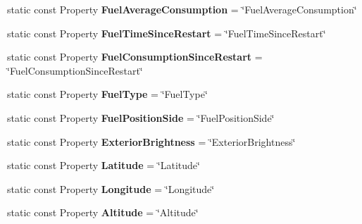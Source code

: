 \begin{DoxyCompactItemize}
\item 
\hypertarget{classVehicleProperty_add43436a1abdac3e56d4bac9ad0f919f}{static const Property {\bfseries Fuel\+Average\+Consumption} = \char`\"{}Fuel\+Average\+Consumption\char`\"{}}\label{classVehicleProperty_add43436a1abdac3e56d4bac9ad0f919f}

\item 
\hypertarget{classVehicleProperty_ac0a8562820cc38f78d806cba49372ed9}{static const Property {\bfseries Fuel\+Time\+Since\+Restart} = \char`\"{}Fuel\+Time\+Since\+Restart\char`\"{}}\label{classVehicleProperty_ac0a8562820cc38f78d806cba49372ed9}

\item 
\hypertarget{classVehicleProperty_a7d6a9cf70c023922f792c3ce7c0b0db0}{static const Property {\bfseries Fuel\+Consumption\+Since\+Restart} = \char`\"{}Fuel\+Consumption\+Since\+Restart\char`\"{}}\label{classVehicleProperty_a7d6a9cf70c023922f792c3ce7c0b0db0}

\item 
\hypertarget{classVehicleProperty_a2df3b5ff14ec4a92fba65ad72be7d5b7}{static const Property {\bfseries Fuel\+Type} = \char`\"{}Fuel\+Type\char`\"{}}\label{classVehicleProperty_a2df3b5ff14ec4a92fba65ad72be7d5b7}

\item 
\hypertarget{classVehicleProperty_a574a971800258aa3d53126ec01e85477}{static const Property {\bfseries Fuel\+Position\+Side} = \char`\"{}Fuel\+Position\+Side\char`\"{}}\label{classVehicleProperty_a574a971800258aa3d53126ec01e85477}

\item 
\hypertarget{classVehicleProperty_a490658c5e633ab54a5bbf11b5f38e994}{static const Property {\bfseries Exterior\+Brightness} = \char`\"{}Exterior\+Brightness\char`\"{}}\label{classVehicleProperty_a490658c5e633ab54a5bbf11b5f38e994}

\item 
\hypertarget{classVehicleProperty_a225bcbd3adba51c5d571a086a98f6b4f}{static const Property {\bfseries Latitude} = \char`\"{}Latitude\char`\"{}}\label{classVehicleProperty_a225bcbd3adba51c5d571a086a98f6b4f}

\item 
\hypertarget{classVehicleProperty_ac5565746cd2dfd2e3f8870d8e292b392}{static const Property {\bfseries Longitude} = \char`\"{}Longitude\char`\"{}}\label{classVehicleProperty_ac5565746cd2dfd2e3f8870d8e292b392}

\item 
\hypertarget{classVehicleProperty_a0411474f4450758ba2dbcdc136ef7391}{static const Property {\bfseries Altitude} = \char`\"{}Altitude\char`\"{}}\label{classVehicleProperty_a0411474f4450758ba2dbcdc136ef7391}


\end{DoxyCompactItemize}
